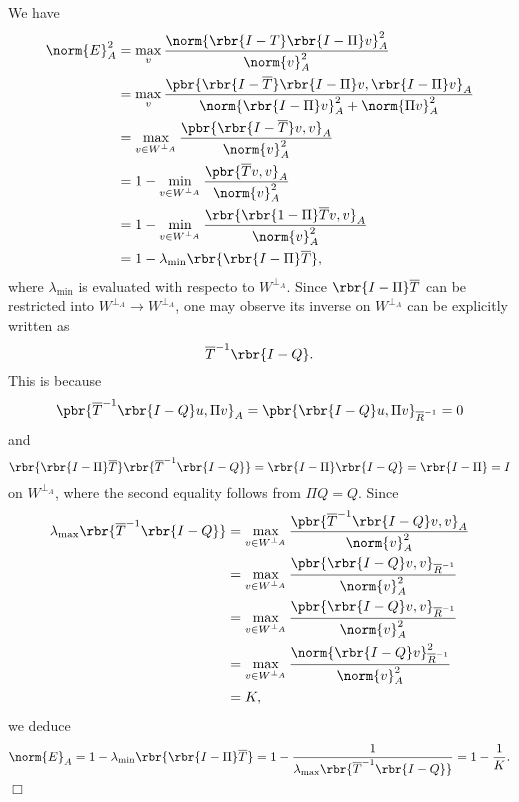 \documentclass[english, nochinese]{pnote}
\begin{document}
We have
\begin{equation}
\begin{split}
\norm{E}_A^2 &= \max_v \frac{\norm{ \rbr{ I - T } \rbr{ I - \Pi } v }_A^2}{\norm{v}_A^2} \\
&= \max_v \frac{ \pbr{ \rbr{ I - \overline{T} } \rbr{ I - \Pi } v, \rbr{ I - \Pi } v }_A}{ \norm{ \rbr{ I - \Pi } v }_A^2 + \norm{ \Pi v }_A^2 } \\
&= \max_{ v \in W^{\perp_A} } \frac{ \pbr{ \rbr{ I - \overline{T} } v, v }_A}{\norm{v}_A^2} \\
&= 1 - \min_{ v \in W^{\perp_A} } \frac{\pbr{ \overline{T} v, v }_A}{\norm{v}_A^2} \\
&= 1 - \min_{ v \in W^{\perp_A} } \frac{\rbr{ \rbr{ 1 - \Pi } \overline{T} v, v }_A}{\norm{v}_A^2} \\
&= 1 - \lambda_{\text{min}} \rbr{ \rbr{ I - \Pi } \overline{T} },
\end{split}
\end{equation}
where $\lambda_{\text{min}}$ is evaluated with respecto to $W^{\perp_A}$. Since $ \rbr{ I - \Pi } \overline{T} $ can be restricted into $ W^{\perp_A} \rightarrow W^{\perp_A} $, one may observe its inverse on $W^{\perp_A}$ can be explicitly written as
\begin{equation}
\overline{T}^{-1} \rbr{ I - Q }.
\end{equation}
This is because
\begin{equation}
\pbr{ \overline{T}^{-1} \rbr{ I - Q } u, \Pi v }_A = \pbr{ \rbr{ I - Q } u, \Pi v }_{\overline{R}^{-1}} = 0
\end{equation}
and
\begin{equation}
\rbr{ \rbr{ I - \Pi } \overline{T} } \rbr{ \overline{T}^{-1} \rbr{ I - Q } } = \rbr{ I - \Pi } \rbr{ I - Q } = \rbr{ I - \Pi } = I
\end{equation}
on $W^{\perp_A}$, where the second equality follows from $ \Pi Q = Q $. Since
\begin{equation}
\begin{split}
\lambda_{\text{max}} \rbr{ \overline{T}^{-1} \rbr{ I - Q } } &= \max_{ v \in W^{\perp_A} } \frac{\pbr{ \overline{T}^{-1} \rbr{ I - Q } v, v }_A}{\norm{v}_A^2} \\
&= \max_{ v \in W^{\perp_A} } \frac{\pbr{\rbr{ I - Q } v, v }_{\overline{R}^{-1}}}{\norm{v}_A^2} \\
&= \max_{ v \in W^{\perp_A} } \frac{\pbr{\rbr{ I - Q } v, v }_{\overline{R}^{-1}}}{\norm{v}_A^2} \\
&= \max_{ v \in W^{\perp_A} } \frac{\norm{ \rbr{ I - Q } v }_{\overline{R}^{-1}}^2}{\norm{v}_A^2} \\
&= K,
\end{split}
\end{equation}
we deduce
\begin{equation}
\norm{E}_A = 1 - \lambda_{\text{min}} \rbr{ \rbr{ I - \Pi } \overline{T} } = 1 - \frac{1}{ \lambda_{\text{max}} \rbr{ \overline{T}^{-1} \rbr{ I - Q } } } = 1 - \frac{1}{K}.
\end{equation}
\hfill$\Box$
\end{document}
